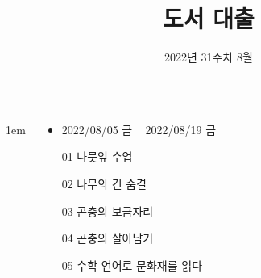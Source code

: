 \documentclass[	20pt, 
							a1paper, 
							portrait, %
							margin=0mm, %
							innermargin=10mm,  		%
							colspace=5mm, 
							subcolspace=0mm
							]{tikzposter}
\title{도서 대출}
\author{ 2022년 31주차 8월  }
\begin{document}
	\maketitle

	\begin{columns}


			{
					\setlength{\leftmargini}{3em}
					\setlength{\labelsep} {1em}
				\begin{LARGE}
					\begin{itemize}
					\item 	2022/08/05 금 ~ 2022/08/19 금
					\item 	[01]  나뭇잎 수업
					\item 	[02]  나무의 긴 숨결
					\item 	[03]  곤충의 보금자리
					\item 	[04]  곤충의 살아남기
					\item 	[05]  수학 언어로 문화재를 읽다
					\end{itemize}
				\end{LARGE}
			}

%





\end{columns}
\end{document}
